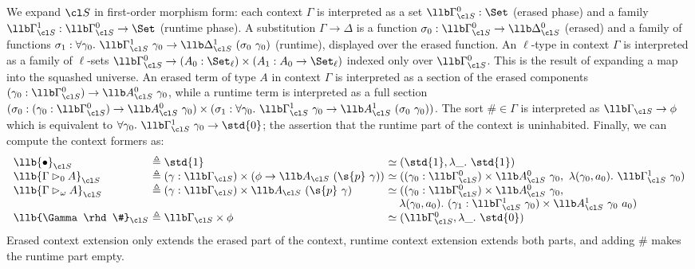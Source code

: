 We expand $\cl S$ in first-order morphism form: each context $\Gamma$ is interpreted as a set
$\llb\Gamma^0_{\cl S} : \Set$ (erased phase) and a family $\llb\Gamma^1_{\cl S} : \llb\Gamma^0_{\cl S} \to \Set$
(runtime phase). A substitution $\Gamma \to \Delta$ is a function $\sigma_0 :
\llb\Gamma^0_{\cl S} \to \llb\Delta^0_{\cl S}$ (erased) and a family of functions $\sigma_1 : \forall \gamma_0.\
\llb\Gamma^1_{\cl S}\ \gamma_0 \to \llb\Delta^1_{\cl S}\ (\sigma_0\ \gamma_0)$ (runtime), displayed over
the erased function. An $\ell$-type in context $\Gamma$ is interpreted as a
family of $\ell$-sets $\llb\Gamma^0_{\cl S} \to (A_0 : \Set_\ell) \times (A_1 : A_0 \to
\Set_\ell)$ indexed only over $\llb\Gamma^0_{\cl S}$. This is the result of expanding a map
into the squashed universe. An erased term of type $A$ in context $\Gamma$ is
interpreted as a section of the erased components $(\gamma_0 : \llb\Gamma^0_{\cl S}) \to
\llb A^0_{\cl S}\ \gamma_0$, while a runtime term is interpreted as a full section $(\sigma_0
: (\gamma_0 : \llb\Gamma^0_{\cl S}) \to \llb A^0_{\cl S}\ \gamma_0) \times (\sigma_1 : \forall \gamma_0.\
\llb\Gamma^1_{\cl S}\ \gamma_0 \to \llb A^1_{\cl S}\ (\sigma_0\ \gamma_0))$. The sort $\# \in \Gamma$ is
interpreted as $\llb\Gamma_{\cl S} \to \phi$ which is equivalent to $\forall
\gamma_0.\ \llb\Gamma^1_{\cl S}\ \gamma_0 \to \std{0}$; the assertion that the runtime part
of the context is uninhabited. Finally, we can compute the context formers as:
\[\begin{array}{l@{\ }l@{\ }l}
\llb{\bullet}_{\cl S} &\triangleq \std{1}
  &\simeq (\std{1}, \lambda\_.\ \std{1}) \\
\llb{\Gamma \rhd_0 A}_{\cl S} &\triangleq (\gamma : \llb\Gamma_{\cl S}) \times (\phi \to \llb A_{\cl S}\ (\s{p}\ \gamma))
  &\simeq ((\gamma_0 : \llb\Gamma^0_{\cl S}) \times \llb A^0_{\cl S}\ \gamma_0,\ \lambda (\gamma_0, a_0).\ \llb\Gamma^1_{\cl S}\ \gamma_0) \\
\llb{\Gamma \rhd_\omega A}_{\cl S} &\triangleq (\gamma : \llb\Gamma_{\cl S}) \times \llb A_{\cl S}\ (\s{p}\ \gamma)
  &\simeq ((\gamma_0 : \llb\Gamma^0_{\cl S}) \times \llb A^0_{\cl S}\ \gamma_0,\\
  &&\quad \lambda (\gamma_0, a_0).\ (\gamma_1 : \llb\Gamma^1_{\cl S}\ \gamma_0) \times \llb A^1_{\cl S}\ \gamma_0\ a_0) \\
\llb{\Gamma \rhd \#}_{\cl S} &\triangleq \llb\Gamma_{\cl S} \times \phi &\simeq (\llb\Gamma^0_{\cl S}, \lambda\_.\ \std{0})
\end{array}\]
Erased context extension only extends the erased part of the context, runtime
context extension extends both parts, and adding $\#$ makes the runtime part
empty.

